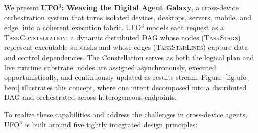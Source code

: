 \documentclass[10pt]{article} %
\newcommand{\ufo}{\textsc{UFO}$^3$\xspace}
\newcommand{\TaskConstellation}{\textsc{TaskConstellation}\xspace}
\newcommand{\TaskStars}{\textsc{TaskStars}\xspace}
\newcommand{\TaskStarLines}{\textsc{TaskStarLines}\xspace}
\begin{document}
We present \textbf{\ufo: Weaving the Digital Agent Galaxy}, a cross-device orchestration system that turns isolated devices, desktops, servers, mobile, and edge, into a coherent execution fabric. \ufo models each request as a \TaskConstellation: a dynamic distributed DAG whose nodes (\TaskStars) represent executable subtasks and whose edges (\TaskStarLines) capture data and control dependencies. The Constellation serves as both the logical plan and live runtime substrate: nodes are assigned asynchronously, executed opportunistically, and continuously updated as results stream. Figure~\ref{fig:ufo-hero} illustrates this concept, where one intent decomposed into a distributed DAG and orchestrated across heterogeneous endpoints. 

To realize these capabilities and address the challenges in cross-device agents, \ufo is built around five tightly integrated design principles:
\end{document}
